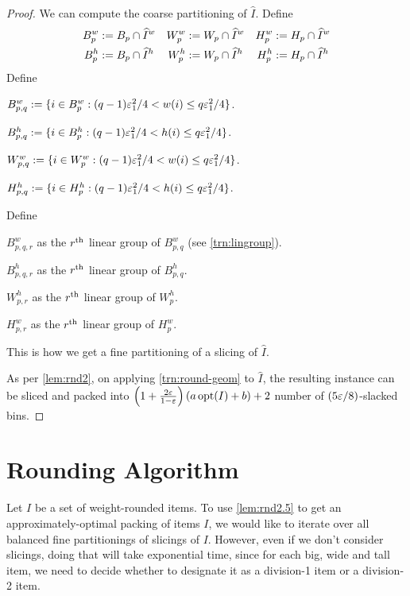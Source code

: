 \begin{proof}
We can compute the coarse partitioning of $\widehat{I}$. Define
\begin{align*}
B_p^w &:= B_p \cap \widehat{I}^w
& W_p^w &:= W_p \cap \widehat{I}^w
& H_p^w &:= H_p \cap \widehat{I}^w
\\ B_p^h &:= B_p \cap \widehat{I}^h
& W_p^h &:= W_p \cap \widehat{I}^h
& H_p^h &:= H_p \cap \widehat{I}^h
\end{align*}
Define
\begin{tightemize}
\item $B^w_{p,q} := \{i \in B^w_p: (q-1)\varepsilon_1^2/4 < w(i) \le q\varepsilon_1^2/4 \}$.
\item $B^h_{p,q} := \{i \in B^h_p: (q-1)\varepsilon_1^2/4 < h(i) \le q\varepsilon_1^2/4 \}$.
\item $W^w_{p,q} := \{i \in W^w_p: (q-1)\varepsilon_1^2/4 < w(i) \le q\varepsilon_1^2/4 \}$.
\item $H^h_{p,q} := \{i \in H^h_p: (q-1)\varepsilon_1^2/4 < h(i) \le q\varepsilon_1^2/4 \}$.
\end{tightemize}
Define
\begin{tightemize}
\item $B^w_{p,q,r}$ as the $r^{\textrm{th}}$ linear group of $B^w_{p,q}$ (see \cref{trn:lingroup}).
\item $B^h_{p,q,r}$ as the $r^{\textrm{th}}$ linear group of $B^h_{p,q}$.
\item $W^h_{p,r}$ as the $r^{\textrm{th}}$ linear group of $W^h_p$.
\item $H^w_{p,r}$ as the $r^{\textrm{th}}$ linear group of $H^w_p$.
\end{tightemize}
This is how we get a fine partitioning of a slicing of $\widehat{I}$.

As per \cref{lem:rnd2}, on applying \cref{trn:round-geom} to $\widehat{I}$,
the resulting instance can be sliced and packed into
$\left(1 + \frac{2\varepsilon}{1-\varepsilon}\right)(a \operatorname{opt}(I) + b) + 2$ number of
$(5\varepsilon/8)$-slacked bins.
\end{proof}

\section{Rounding Algorithm}
\label{sec:gv-rbbp:round}

Let $I$ be a set of weight-rounded items.
To use \cref{lem:rnd2.5} to get an approximately-optimal packing of items $I$,
we would like to iterate over all balanced fine partitionings of slicings of $I$.
However, even if we don't consider slicings, doing that will take exponential time,
since for each big, wide and tall item, we need to decide whether to designate it
as a division-1 item or a division-2 item.

